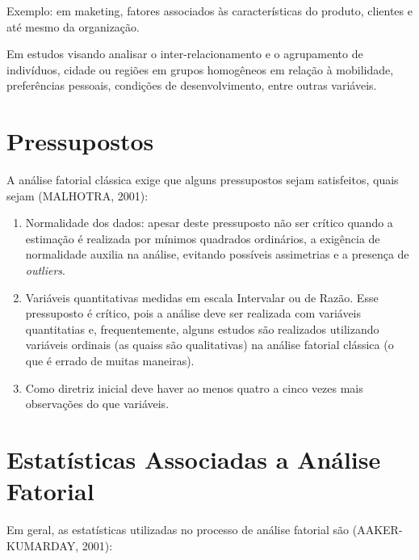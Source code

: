 \documentclass[12pt,brazil,]{book}
\begin{document}
Exemplo: em maketing, fatores associados às características do produto,
clientes e até mesmo da organização.

Em estudos visando analisar o inter-relacionamento e o agrupamento de
indivíduos, cidade ou regiões em grupos homogêneos em relação à
mobilidade, preferências pessoais, condições de desenvolvimento, entre
outras variáveis.

\hypertarget{pressupostos}{%
\section{Pressupostos}\label{pressupostos}}

A análise fatorial clássica exige que alguns pressupostos sejam
satisfeitos, quais sejam (MALHOTRA, 2001):

\begin{enumerate}
\def\labelenumi{\alph{enumi}.}
\item
  Normalidade dos dados: apesar deste pressuposto não ser crítico quando
  a estimação é realizada por mínimos quadrados ordinários, a exigência
  de normalidade auxilia na análise, evitando possíveis assimetrias e a
  presença de \emph{outliers}.
\item
  Variáveis quantitativas medidas em escala Intervalar ou de Razão. Esse
  pressuposto é crítico, pois a análise deve ser realizada com variáveis
  quantitatias e, frequentemente, alguns estudos são realizados
  utilizando variáveis ordinais (as quaiss são qualitativas) na análise
  fatorial clássica (o que é errado de muitas maneiras).
\item
  Como diretriz inicial deve haver ao menos quatro a cinco vezes mais
  observações do que variáveis.
\end{enumerate}

\hypertarget{estatisticas-associadas-a-analise-fatorial}{%
\section{Estatísticas Associadas a Análise
Fatorial}\label{estatisticas-associadas-a-analise-fatorial}}

Em geral, as estatísticas utilizadas no processo de análise fatorial são
(AAKER-KUMARDAY, 2001):
\end{document}
